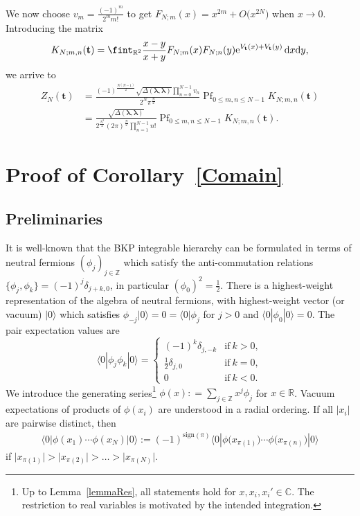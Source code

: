 \documentclass[10pt,a4paper]{amsart}
\numberwithin{equation}{section}
\newcommand{\dd}{\mathrm{d}}
\begin{document}
We now choose $v_m = \frac{(-1)^m}{2^m m!}$ to get $F_{N;m}(x) = x^{2m} + O\bigl(x^{2N}\bigr)$ when $x \rightarrow 0$. Introducing the matrix
\[
K_{N;m,n}(\mathbf{t}) = \fint_{\mathbb{R}^2} \frac{x - y}{x + y}F_{N;m}(x)F_{N;n}(y) {\rm e}^{V_{\mathbf{t}}(x) + V_{\mathbf{t}}(y)}\, \dd x \dd y,
\]
we arrive to
\begin{equation*}
\begin{split}
Z_N(\mathbf{t}) & = \frac{(-1)^{\frac{N(N - 1)}{2}} \sqrt{\Delta(\boldsymbol{\lambda},\boldsymbol{\lambda})} \prod_{n = 0}^{N - 1} v_n}{2^N \pi^{\frac{N}{2}}}   \operatorname{Pf}_{0 \leq m,n \leq N - 1} K_{N;m,n}(\mathbf{t}) \\
& = \frac{\sqrt{\Delta(\boldsymbol{\lambda},\boldsymbol{\lambda})}}{2^{\frac{N^2}{2}} (2\pi)^{\frac{N}{2}} \prod_{n = 1}^{N - 1} n!}  \operatorname{Pf}_{0 \leq m,n \leq N - 1} K_{N;m,n}(\mathbf{t}).
\end{split}
\end{equation*}


 \section{Proof of Corollary~\ref{Comain}}
\label{SproofBKP}


\subsection{Preliminaries}
It is well-known that the BKP integrable hierarchy can be formulated
in terms of
neutral fermions $(\phi_j)_{j \in \mathbb{Z}}$ which satisfy
the anti-commutation relations
$ \{\phi_j,\phi_k\} =(-1)^j \delta_{j+k,0}$,
in particular $(\phi_0)^2=\tfrac{1}{2}$. There is a highest-weight representation of the algebra of neutral fermions, with highest-weight vector (or vacuum) $|0\rangle$
which satisfies
$\phi_{-j} |0\rangle =0 =\langle 0| \phi_{j}$ for $j>0$ and
$\langle 0|\phi_0|0\rangle=0$. The pair expectation values are
\begin{equation}
\label{pair-expectation}
 \langle 0| \phi_j \phi_k |0\rangle =
 \begin{cases}
 (-1)^k\delta_{j,-k}& \text{if}\ k>0,\\
\frac{1}{2}\delta_{j,0}& \text{if}\ k=0,\\
 0& \text{if}\ k<0.
 \end{cases}
 \end{equation}
 We introduce the generating series\footnote{Up to Lemma~\ref{lemmaRes},
 all statements hold for $x,x_i,x_i'\in \mathbb{C}$. The restriction to
 real variables is motivated by the intended integration.}
$ \phi(x): = \sum_{j \in \mathbb {Z}} x^j \phi_j $
for $x \in \mathbb{R}$. Vacuum expectations of
products of $\phi(x_i)$ are understood in a radial ordering. If
all $|x_i|$ are pairwise distinct, then
\begin{gather}
 \langle 0|\phi(x_1)\cdots \phi(x_{N})|0\rangle
:=(-1)^{\mathrm{sign}(\pi)}
\langle 0|\phi\bigl(x_{\pi(1)}\bigr)\cdots \phi\bigl(x_{\pi(n)}\bigr)|0\rangle\label{radialordering}
\end{gather}
if $\bigl|x_{\pi(1)}\bigr|>\bigl|x_{\pi(2)}\bigr|>\dots >\bigl|x_{\pi(N)}\bigr|$.
\end{document}
